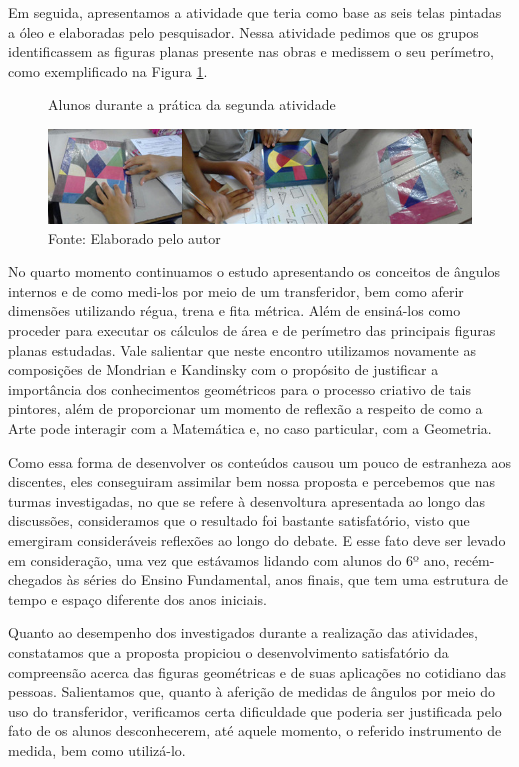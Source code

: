 \begin{refsection}
    Em seguida, apresentamos a atividade que teria como base as seis telas pintadas a óleo e elaboradas pelo pesquisador. Nessa atividade pedimos que os grupos identificassem as figuras planas presente nas obras e medissem o seu perímetro, como exemplificado na Figura \ref{fig:alunos-durante-2a-pratica}.

    \begin{figure}[ht]%
        \centering%
        \caption{Alunos durante a prática da segunda atividade}%
        \includegraphics[width=.90\textwidth]{articles/04-matematica-na-arte--/figura7.jpg}%
        \caption*{Fonte: Elaborado pelo autor}%
        \label{fig:alunos-durante-2a-pratica}%
    \end{figure}%

    No quarto momento continuamos o estudo apresentando os conceitos de ângulos internos e de como medi-los por meio de um transferidor, bem como aferir dimensões utilizando régua, trena e fita métrica. Além de ensiná-los como proceder para executar os cálculos de área e de perímetro das principais figuras planas estudadas. Vale salientar que neste encontro utilizamos novamente as composições de Mondrian e Kandinsky com o propósito de justificar a importância dos conhecimentos geométricos para o processo criativo de tais pintores, além de proporcionar um momento de reflexão a respeito de como a Arte pode interagir com a Matemática e, no caso particular, com a Geometria.  

    Como essa forma de desenvolver os conteúdos causou um pouco de estranheza aos discentes, eles conseguiram assimilar bem nossa proposta e percebemos que nas turmas investigadas, no que se refere à desenvoltura apresentada ao longo das discussões, consideramos que o resultado foi bastante satisfatório, visto que emergiram consideráveis reflexões ao longo do debate. E esse fato deve ser levado em consideração, uma vez que estávamos lidando com alunos do 6º ano, recém-chegados às séries do Ensino Fundamental, anos finais, que tem uma estrutura de tempo e espaço diferente dos anos iniciais. 

    Quanto ao desempenho dos investigados durante a realização das atividades, constatamos que a proposta propiciou o desenvolvimento satisfatório da compreensão acerca das figuras geométricas e de suas aplicações no cotidiano das pessoas. Salientamos que, quanto à aferição de medidas de ângulos por meio do uso do transferidor, verificamos certa dificuldade que poderia ser justificada pelo fato de os alunos desconhecerem, até aquele momento, o referido instrumento de medida, bem como utilizá-lo. 


\end{refsection}
